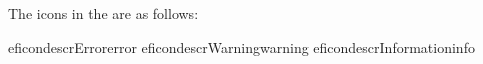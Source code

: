 
The icons in the \gdprobview are as follows:

\begin{gdreficon}
  \jb{}eficondescr{Error}{error}
  \jb{}eficondescr{Warning}{warning}
  \jb{}eficondescr{Information}{info}
\end{gdreficon}
